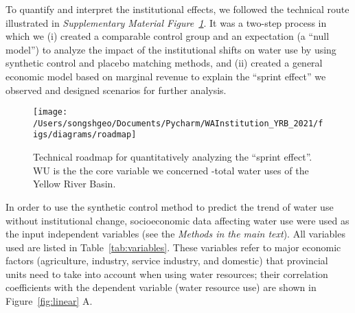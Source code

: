 
To quantify and interpret the institutional effects, we followed the technical route illustrated in \textit{Supplementary Material Figure~\ref{fig:roadmap}}. It was a two-step process in which we
(i) created a comparable control group and an expectation (a “null model”) to analyze the impact of the institutional shifts on water use by using synthetic control and placebo matching methods, and
(ii) created a general economic model based on marginal revenue to explain the “sprint effect” we observed and designed scenarios for further analysis.

\begin{figure}[!hbt]
    \centering
    \texttt{[image: /Users/songshgeo/Documents/Pycharm/WAInstitution\_YRB\_2021/figs/diagrams/roadmap]}
    \caption{
        Technical roadmap for quantitatively analyzing the “sprint effect”. WU is the the core variable we concerned -total water uses of the Yellow River Basin.
    }
    \label{fig:roadmap}
\end{figure}

In order to use the synthetic control method to predict the trend of water use without institutional change, socioeconomic data affecting water use were used as the input independent variables (see the \textit{Methods in the main text}). All variables used are listed in Table~\ref{tab:variables}.
These variables refer to major economic factors (agriculture, industry, service industry, and domestic) that provincial units need to take into account when using water resources; their correlation coefficients with the dependent variable (water resource use) are shown in Figure~\ref{fig:linear} A.

